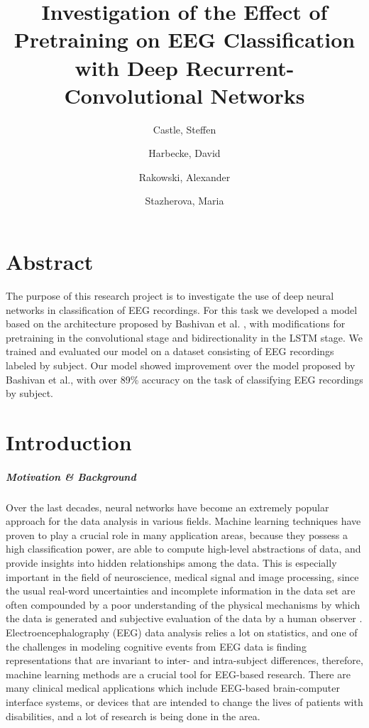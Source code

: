\documentclass{article}
\title{Investigation of the Effect of Pretraining on EEG Classification with Deep Recurrent-Convolutional Networks}
\author{Castle, Steffen \and Harbecke, David \and Rakowski, Alexander \and Stazherova, Maria}
\begin{document}
\maketitle
{}
	

\maketitle

\section*{Abstract}
The purpose of this research project is to investigate the use of deep neural networks in classification of EEG recordings. For this task we developed a model based on the architecture proposed by Bashivan et al. \cite{learning_eeg_repr}, with modifications for pretraining in the convolutional stage and bidirectionality in the LSTM stage. We trained and evaluated our model on a dataset consisting of EEG recordings labeled by subject. Our model showed improvement over the model proposed by Bashivan et al., with over 89\% accuracy on the task of classifying EEG recordings by subject. 

\section{Introduction}
\subparagraph{Motivation \& Background} Over the last decades, neural networks have become an extremely popular approach for the data analysis in various fields. Machine learning techniques have proven to play a crucial role in many application areas, because they possess a high classification power, are able to compute high-level abstractions of data, and provide insights into hidden relationships among the data. This is especially important in the field of neuroscience, medical signal and image processing, since the usual real-word uncertainties and incomplete information in the data set are often compounded by a poor understanding of the physical mechanisms by which the data is generated and subjective evaluation of the data by a human observer \cite{roberts}. Electroencephalography (EEG) data analysis relies a lot on statistics, and one of the challenges in modeling cognitive events from EEG data is finding representations that are invariant to inter- and intra-subject differences, therefore, machine learning methods are a crucial tool for EEG-based research. There are many clinical medical applications which include EEG-based brain-computer interface systems, or devices that are intended to change the lives of patients with disabilities, and a lot of research is being done in the area. 
\end{document}
